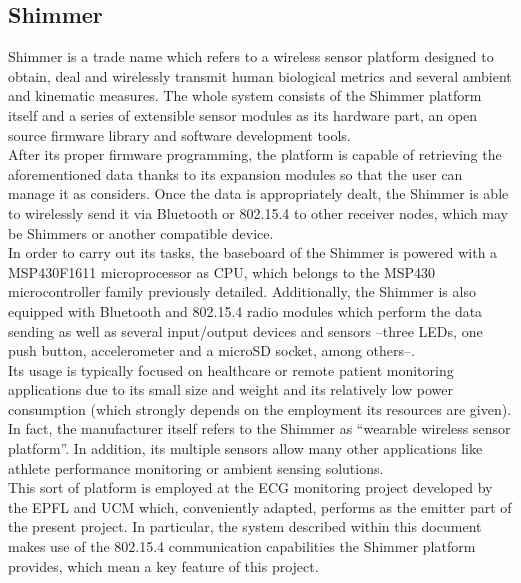 		\subsection{Shimmer\texttrademark}
		\label{ssec:shimmer}
			Shimmer \cite{Shimmer} is a trade name which refers to a wireless sensor platform designed to
			obtain, deal and wirelessly transmit human biological metrics and several ambient and
			kinematic measures. The whole system consists of the Shimmer platform itself and a series of
			extensible sensor modules as its hardware part, an open source firmware library and software
			development tools.\\

			After its proper firmware programming, the platform is capable of retrieving the aforementioned data
			thanks to its expansion modules \cite{ShimmerExp} so that the user can manage it as considers. Once
			the data is appropriately dealt, the Shimmer is able to wirelessly send it via Bluetooth or 802.15.4
			to other receiver nodes, which may be Shimmers or another compatible device.\\

			In order to carry out its tasks, the baseboard of the Shimmer is powered with a MSP430F1611
			microprocessor as CPU, which belongs to the MSP430 microcontroller family previously detailed.
			Additionally, the Shimmer is also equipped with Bluetooth and 802.15.4 radio modules which perform
			the data sending as well as several input/output devices and sensors --three LEDs, one push button,
			accelerometer and a microSD socket, among others--.\\

			Its usage is typically focused on healthcare or remote patient monitoring applications due to its
			small size and weight and its relatively low power consumption (which strongly depends on the
			employment its resources are given). In fact, the manufacturer itself refers to the Shimmer as 
			``wearable wireless sensor platform''. In addition, its multiple sensors allow many other
			applications like athlete performance monitoring or ambient sensing solutions.\\

			This sort of platform is employed at the ECG monitoring project \cite{ESL} developed by the EPFL and
			UCM which, conveniently adapted, performs as the emitter part of the present project. In particular,
			the system described within this document makes use of the 802.15.4 communication capabilities the
			Shimmer platform provides, which mean a key feature of this project.\\

